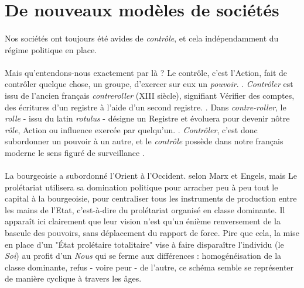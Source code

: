 \section{De nouveaux modèles de sociétés}

\paragraph{} Nos sociétés ont toujours été avides de \emph{contrôle}, et cela indépendamment du régime politique en 
place. 

\paragraph{} Mais qu'entendons-nous exactement par là ? Le contrôle, c'est l'\guillemotleft Action, fait de contrôler
quelque chose, un groupe, d'exercer sur eux un \emph{pouvoir}. \guillemotright. \cite{Controle0} \emph{Contrôler} est
issu de l'ancien français \emph{contreroller} (XIII siècle), signifiant \guillemotleft Vérifier des comptes, des
écritures d'un registre à l'aide d'un second registre. \guillemotright. \cite{Controle1} Dans \emph{contre-roller}, le 
\emph{rolle} - issu du latin \emph{rotulus} - désigne un \guillemotleft Registre \guillemotright et évoluera pour devenir
nôtre \emph{rôle}, \guillemotleft Action ou influence exercée par quelqu'un. \guillemotright. \emph{Contrôler}, c'est donc
subordonner un pouvoir à un autre, et le \emph{contrôle} possède dans notre français moderne le sens figuré de \guillemotleft
surveillance \guillemotright.

\paragraph{} \guillemotleft La bourgeoisie a subordonné l'Orient à l'Occident. \guillemotright selon Marx et Engels,
mais \guillemotleft Le prolétariat utilisera sa domination politique pour arracher peu à peu tout le capital à la
bourgeoisie, pour centraliser tous les instruments de production entre les mains de l'Etat, c'est-à-dire du prolétariat
organisé en classe dominante.\guillemotright \cite{Marx1} Il apparaît ici clairement que leur vision
n'est qu'un énième renversement de la bascule des pouvoirs, sans déplacement du rapport de force. Pire que cela, la mise
en place d'un "État prolétaire totalitaire" vise à faire disparaître l'individu (le \emph{Soi}) au profit d'un \emph{Nous}
qui se ferme aux différences : homogénéisation de la classe dominante, refus - voire peur - de l'autre, ce schéma semble
se représenter de manière cyclique à travers les âges.

